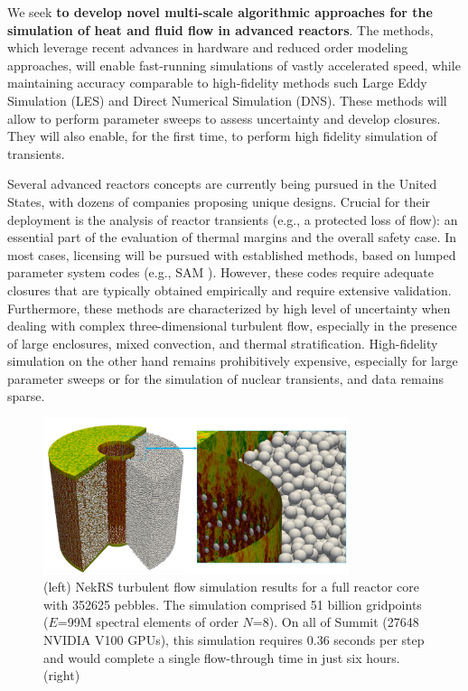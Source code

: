We seek \textbf{to develop novel multi-scale algorithmic approaches for the
simulation of heat and fluid flow in advanced reactors}. The methods, which
leverage recent advances in hardware and reduced order modeling approaches,
will enable fast-running simulations of vastly accelerated speed, while
maintaining accuracy comparable to high-fidelity methods such Large Eddy
Simulation (LES) and Direct Numerical Simulation (DNS). These methods will
allow to perform
parameter sweeps to assess uncertainty and develop closures. They will also
enable, for the first time, to perform high fidelity simulation of transients.

Several  advanced reactors concepts are currently being pursued in the United
States, with dozens of companies proposing unique designs. Crucial for their
deployment is the analysis of  reactor transients (e.g., a protected loss of
flow): an essential part of the evaluation of thermal margins and the overall
safety case.  In most cases, licensing will be pursued with established
methods, based on lumped parameter system codes (e.g., SAM \cite{hu2021}).
However, these codes require adequate closures that are typically obtained
empirically and require extensive validation. Furthermore, these methods are
characterized by high level of uncertainty when dealing with complex
three-dimensional turbulent flow, especially in the presence of large
enclosures, mixed convection, and thermal stratification. High-fidelity
simulation on the other hand remains prohibitively expensive, especially for
large parameter sweeps or for the simulation of nuclear transients, and data
remains sparse.

\begin{figure}[t!] \centering
    \includegraphics[width = 0.80\textwidth]{figs/pbr_pair.png}
    \caption{(left) NekRS turbulent flow simulation results for a full reactor
core with 352625 pebbles.  The simulation comprised 51 billion gridpoints
($E$=99M spectral elements of order $N$=8).  On all of Summit (27648 NVIDIA
V100 GPUs), this simulation requires 0.36 seconds per step and would complete a
single flow-through time in just six hours.
(right)
\label{fig:pbr}}
\end{figure}


